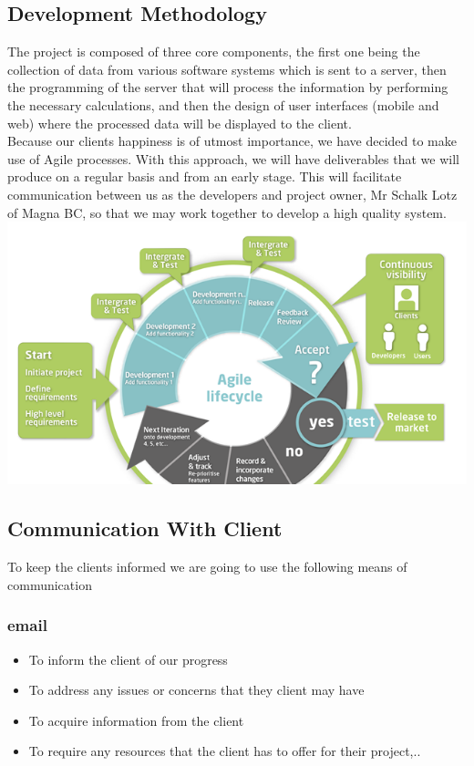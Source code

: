 \documentclass[a4paper,12pt]{article}
\begin{document}
\subsection{Development Methodology}
The project is composed of three core components, the first one being the collection of data from various software systems which is sent to a server, then the programming of the server that will process the information by performing the necessary calculations, and then the design of user interfaces (mobile and web) where the processed data will be displayed to the client.\\
Because our clients happiness is of utmost importance, we have decided to make use of Agile processes. With this approach, we will have deliverables that we will produce on a regular basis and from an early stage. This will facilitate communication between us as the developers and project owner, Mr Schalk Lotz of Magna BC, so that we may work together to develop a high quality system.\\
\includegraphics[width=\textwidth]{images/agileDev.png}
\subsection{Communication With Client}
To keep the clients informed we are going to use the following means of communication
\subsubsection{email}
\begin{itemize}
\item To inform the client of our progress
\item To address any issues or concerns that they client may have
\item To acquire information from the client
\item To require any resources that the client has to offer for their project,..
\end{itemize}
\end{document}
